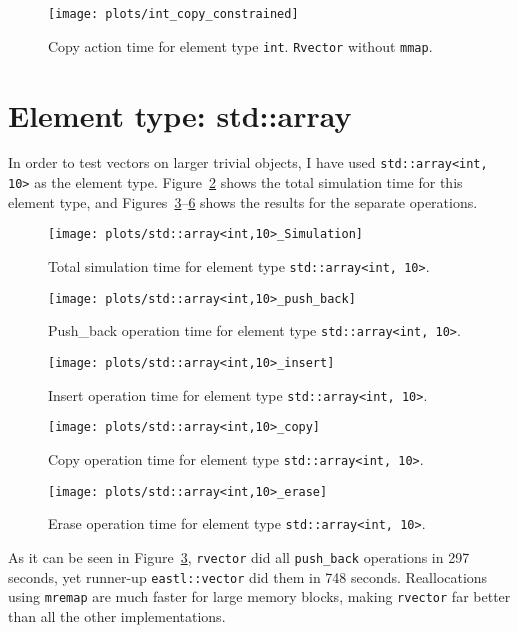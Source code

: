 \documentclass[inz, english, shortabstract]{iithesis}
\begin{document}
\begin{figure}[h!]
\texttt{[image: plots/int\_copy\_constrained]}
\caption{Copy action time for element type \lstinline{int}{}. {\tt Rvector} without {\tt mmap}.}
\label{int_copy_constrained}
\end{figure}

\clearpage
\section{Element type: std::array}

In order to test vectors on larger trivial objects, I have used \lstinline{std::array<int, 10>}{} as the element type.
Figure~\ref{array_simulation} shows the total simulation time for this element type, and Figures~\ref{array_push_back}--\ref{array_erase} shows the results for the separate operations.

\begin{figure}[h!]
\texttt{[image: plots/std::array<int,10>\_Simulation]}
\caption{Total simulation time for element type \lstinline{std::array<int, 10>}{}.}
\label{array_simulation}
\end{figure}

\begin{figure}[h!]
\texttt{[image: plots/std::array<int,10>\_push\_back]}
\caption{Push\_back operation time for element type \lstinline{std::array<int, 10>}{}.}
\label{array_push_back}
\end{figure}

\begin{figure}[h!]
\texttt{[image: plots/std::array<int,10>\_insert]}
\caption{Insert operation time for element type \lstinline{std::array<int, 10>}{}.}
\label{array_insert}
\end{figure}

\begin{figure}[h!]
\texttt{[image: plots/std::array<int,10>\_copy]}
\caption{Copy operation time for element type \lstinline{std::array<int, 10>}{}.}
\label{array_copy}
\end{figure}

\begin{figure}[h!]
\texttt{[image: plots/std::array<int,10>\_erase]}
\caption{Erase operation time for element type \lstinline{std::array<int, 10>}{}.}
\label{array_erase}
\end{figure}

As it can be seen in Figure~\ref{array_push_back}, {\tt rvector} did all {\tt push\_back} operations in 297 seconds, yet runner-up {\tt eastl::vector} did them in 748 seconds.
Reallocations using {\tt mremap} are much faster for large memory blocks, making {\tt rvector} far better than all the other implementations.
\end{document}
